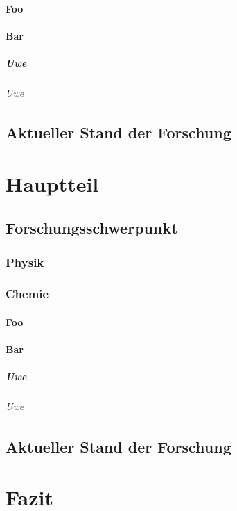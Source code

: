 \documentclass[ngerman,12pt,parskip=half]{scrreprt}
\begin{document}
\subsubsection{Foo}

\blindtext[5]

\subsubsection{Bar}

\blindtext[5]

\paragraph{Uwe} \blindtext

\subparagraph{Uwe} \blindtext

\section{Aktueller Stand der Forschung}

\blindtext[5]



\chapter{Hauptteil}

\section{Forschungsschwerpunkt}

\blindtext[5]

\subsection{Physik}

\blindtext[5]

\subsection{Chemie}

\blindtext[5]

\subsubsection{Foo}

\blindtext[5]

\subsubsection{Bar}

\blindtext[5]

\paragraph{Uwe} \blindtext

\subparagraph{Uwe} \blindtext

\section{Aktueller Stand der Forschung}

\blindtext[5]

\chapter{Fazit}

\blindtext[25]
\end{document}
